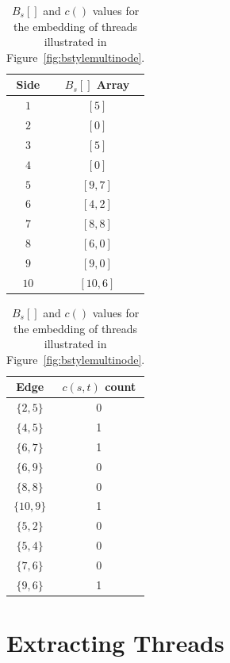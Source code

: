 \begin{table}[h!]
\caption[{$B_s[]$} and {$c()$} values for Figure~\ref{fig:bstylemultinode}]{$B_s[]$ and $c()$ values for the embedding of threads illustrated in Figure~\ref{fig:bstylemultinode}.}
\label{tbl:barrays}
\centering
\begin{tabular} { c | c }
Side & $B_s[]$ Array \\
\hline
$1$ & $[5]$ \\
$2$ & $[0]$ \\
$3$ & $[5]$ \\
$4$ & $[0]$ \\
$5$ & $[9, 7]$ \\
$6$ & $[4, 2]$ \\
$7$ & $[8, 8]$ \\
$8$ & $[6, 0]$ \\
$9$ & $[9, 0]$ \\
$10$ & $[10, 6]$ \\
\end{tabular}
\begin{tabular}{ c | c }
Edge & $c(s, t)$ count \\
\hline
$\{2, 5\}$ & 0 \\
$\{4, 5\}$ & 1 \\
$\{6, 7\}$ & 1 \\
$\{6, 9\}$ & 0 \\
$\{8, 8\}$ & 0 \\
$\{10, 9\}$ & 1 \\
$\{5, 2\}$ & 0 \\
$\{5, 4\}$ & 0 \\
$\{7, 6\}$ & 0 \\
$\{9, 6\}$ & 1 \\
\end{tabular}

\end{table}


\section{Extracting Threads}

